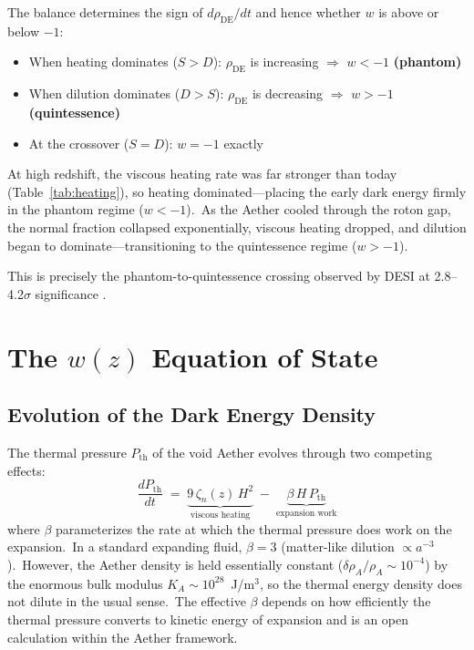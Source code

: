 \documentclass[12pt,letterpaper]{article}
\newcommand{\rhoa}{\rho_{\!A}}
\newcommand{\Ka}{K_{\!A}}
\begin{document}
The balance determines the sign of $d\rho_{\mathrm{DE}}/dt$ and hence
whether $w$ is above or below $-1$:

\begin{itemize}[leftmargin=2em]
  \item When heating dominates ($S > D$): $\rho_{\mathrm{DE}}$ is increasing
    $\Rightarrow$ $w < -1$ \textbf{(phantom)}
  \item When dilution dominates ($D > S$): $\rho_{\mathrm{DE}}$ is decreasing
    $\Rightarrow$ $w > -1$ \textbf{(quintessence)}
  \item At the crossover ($S = D$): $w = -1$ exactly
\end{itemize}

At high redshift, the viscous heating rate was far stronger than today
(Table~\ref{tab:heating}), so heating dominated---placing the early dark energy
firmly in the phantom regime ($w < -1$).\ As the Aether cooled through the roton
gap, the normal fraction collapsed exponentially, viscous heating dropped, and
dilution began to dominate---transitioning to the quintessence regime ($w > -1$).

This is precisely the phantom-to-quintessence crossing observed by DESI at
2.8--4.2$\sigma$ significance \cite{desi2025}.


\section{The \texorpdfstring{$w(z)$}{w(z)} Equation of State}
\label{sec:wz}

\subsection{Evolution of the Dark Energy Density}

The thermal pressure $P_{\mathrm{th}}$ of the void Aether evolves through two
competing effects:
%
\begin{equation}
  \frac{dP_{\mathrm{th}}}{dt} \;=\;
    \underbrace{9\,\zeta_n(z)\,H^2}_{\text{viscous heating}}
    \;-\; \underbrace{\beta\,H\,P_{\mathrm{th}}}_{\text{expansion work}}
  \label{eq:P-evolution}
\end{equation}
%
where $\beta$ parameterizes the rate at which the thermal pressure does
work on the expansion.\ In a standard expanding fluid, $\beta = 3$
(matter-like dilution $\propto a^{-3}$).\ However, the Aether density is
held essentially constant ($\delta\rhoa/\rhoa \sim 10^{-4}$) by the
enormous bulk modulus $\Ka \sim 10^{28}$~J/m$^3$, so the thermal energy
density does not dilute in the usual sense.\ The effective $\beta$ depends
on how efficiently the thermal pressure converts to kinetic energy of expansion
and is an open calculation within the Aether framework.
\end{document}
